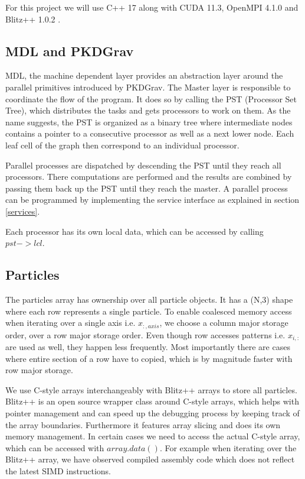 \documentclass[]{article}
\begin{document}
For this project we will use C++ 17 along with CUDA 11.3, OpenMPI 4.1.0 and Blitz++ 1.0.2 \cite{blitzcpp}. 

\subsection{MDL and PKDGrav}

MDL, the machine dependent layer provides an abstraction layer around the parallel primitives introduced by PKDGrav. The Master layer is responsible to coordinate the flow of the program. It does so by calling the PST (Processor Set Tree), which distributes the tasks and gets processors to work on them. As the name suggests, the PST is organized as a binary tree where intermediate nodes contains a pointer to a consecutive processor as well as a next lower node. Each leaf cell of the graph then correspond to an individual processor.

Parallel processes are dispatched by descending the PST until they reach all processors. There computations are performed and the results are combined by passing them back up the PST until they reach the master.
A parallel process can be programmed by implementing the service interface as explained in section \ref{services}.

Each processor has its own local data, which can be accessed by calling $pst->lcl$. 

\subsection{Particles}

The particles array has ownership over all particle objects. It has a (N,3) shape where each row represents a single particle. To enable coalesced memory access when iterating over a single axis i.e. $x_{:, axis}$, we choose a column major storage order, over a row major storage order. Even though row accesses patterns i.e. $x_{i,:}$ are used as well, they happen less frequently. Most importantly there are cases where entire section of a row have to copied, which is by magnitude faster with row major storage.

We use C-style arrays interchangeably with Blitz++ arrays to store all particles. Blitz++ is an open source wrapper class around C-style arrays, which helps with pointer management and can speed up the debugging process by keeping track of the array boundaries. Furthermore it features array slicing and does its own memory management. In certain cases we need to access the actual C-style array, which can be accessed with $array.data()$. For example when iterating over the Blitz++ array, we have observed compiled assembly code  which does not reflect the latest SIMD instructions.
\end{document}

